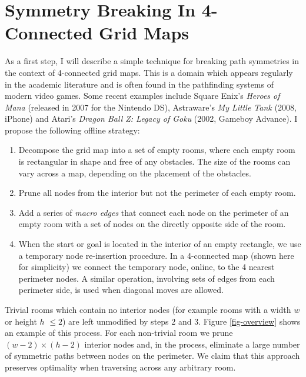 \section{Symmetry Breaking In 4-Connected Grid Maps}
\label{sec::rsr::symm4c}
As a first step, I will describe a simple technique for breaking path symmetries 
in the context of 4-connected grid maps.
This is a domain which appears regularly in the academic literature
\cite{yap02,wang08,pochter10} and is often found in the pathfinding systems of
modern video games.  Some recent examples include Square Enix's \emph{Heroes of
Mana} (released in 2007 for the Nintendo DS), Astraware's \emph{My Little Tank}
(2008, iPhone) and Atari's \emph{Dragon Ball Z: Legacy of Goku} (2002, Gameboy
Advance).
I propose the following offline strategy:

\begin{enumerate}
\item{Decompose the grid map into a set of empty rooms, where each empty room is
rectangular in shape and free of any obstacles.  The size of the rooms can vary
across a map, depending on the placement of the obstacles.}
\item{Prune all nodes from the interior but not the perimeter of each empty
room.}
\item{Add a series of \emph{macro edges} that connect each node on the perimeter
of an empty room with a set of nodes on the directly opposite side of the room.}
\item{When the start or goal is located in the interior of an empty rectangle, we use
a temporary node re-insertion procedure.  In a 4-connected map (shown here for
simplicity) we connect the temporary node, online, to the 4 nearest perimeter
nodes. A similar operation, involving sets of edges from each perimeter side, is
used when diagonal moves are allowed.}
\end{enumerate}

Trivial rooms which contain no interior nodes (for example rooms with a width $w$ or height $h$ 
$\leq 2$) are left unmodified by steps 2 and 3.
Figure \ref{fig-overview} shows an example of this process.
For each non-trivial room we prune $(w-2)\times(h-2)$ interior
nodes and, in the process, eliminate a large number of symmetric paths between 
nodes on the perimeter.
We claim that this approach preserves optimality when traversing across any arbitrary room.

